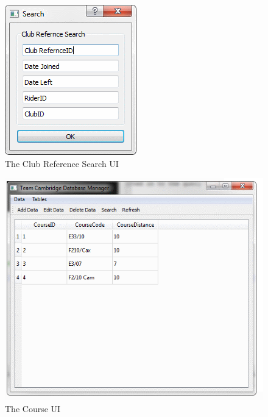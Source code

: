 \begin{figure}
\includegraphics[width=\textwidth]{./Maintenance/UI/ClubRefSearch.png}
\caption{The Club Reference Search UI} \label{fig:ClubRefSearch_UI}
\end{figure}

\begin{figure}
\includegraphics[width=\textwidth]{./Maintenance/UI/Course.png}
\caption{The Course UI} \label{fig:Course_UI}
\end{figure}

